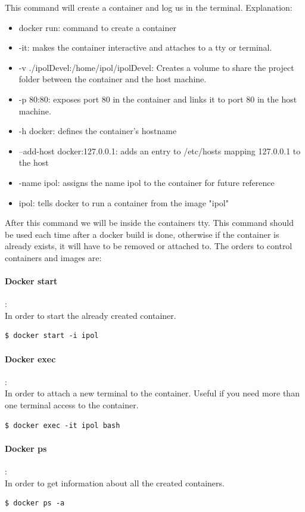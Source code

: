 \documentclass[a4paper,12pt]{article}
\begin{document}
This command will create a container and log us in the terminal. Explanation:
\begin{itemize}
  \item docker run: command to create a container
  \item -it: makes the container interactive and attaches to a tty or terminal.
  \item -v ./ipolDevel:/home/ipol/ipolDevel: Creates a volume to share the project folder between the container and the host machine.
  \item -p 80:80: exposes port 80 in the container and links it to port 80 in the host machine.
  \item -h docker: defines the container's hostname
  \item --add-host docker:127.0.0.1: adds an entry to /etc/hosts mapping 127.0.0.1 to the host
  \item -name ipol: assigns the name ipol to the container for future reference
  \item ipol: tells docker to run a container from the image "ipol"
\end{itemize}

After this command we will be inside the containers tty. This command should be used each time after a docker build is done,
otherwise if the container is already exists, it will have to be removed or attached to. The orders to control containers and images are:

\paragraph{Docker start}:\\
In order to start the already created container.
\begin{lstlisting}[firstnumber=1,breaklines]
  $ docker start -i ipol
\end{lstlisting}

\paragraph{Docker exec}:\\
In order to attach a new terminal to the container. Useful if you need more than one terminal access to the container.
\begin{lstlisting}[firstnumber=1,breaklines]
  $ docker exec -it ipol bash
\end{lstlisting}

\paragraph{Docker ps}:\\
In order to get information about all the created containers.
\begin{lstlisting}[firstnumber=1,breaklines]
  $ docker ps -a
\end{lstlisting}
\end{document}
